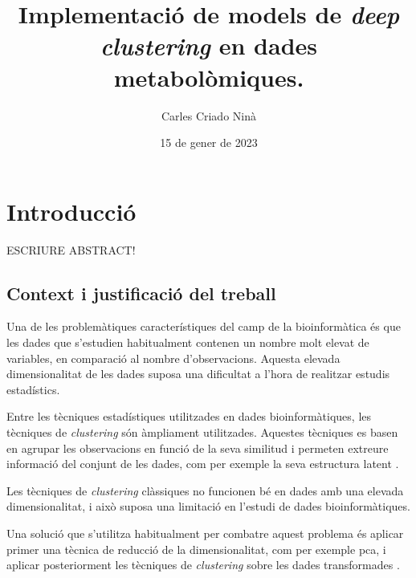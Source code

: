 \documentclass[CAT,BIB]{TFUOC}%
\title{Implementació de models de \textit{deep clustering} en dades metabolòmiques.}
\author{Carles Criado Ninà}
\date{15 de gener de 2023}
\newcommand{\todo}[1]{
            \begin{tcolorbox}[title=ToDo!, colback=red!5!white, colframe=red!50!black, coltext=red!50!black]
            #1
            \end{tcolorbox}}
\begin{document}
\estructura

\tableofcontents

\listoffigures

\listoftables




\chapter{Introducció}
\label{s:intro}

\todo{ESCRIURE ABSTRACT!}

    \section{Context i justificació del treball}
    \label{s:contect}

        Una de les problemàtiques característiques
        del camp de la bioinformàtica
        és que les dades que s'estudien
        habitualment contenen un nombre molt elevat de variables,
        en comparació al nombre d'observacions.
        Aquesta elevada dimensionalitat de les dades
        suposa una dificultat a l'hora de realitzar estudis estadístics.

        Entre les tècniques estadístiques
        utilitzades en dades bioinformàtiques,
        les tècniques de \textit{clustering}
        són àmpliament utilitzades.
        Aquestes tècniques es basen en agrupar les observacions
        en funció de la seva similitud
        i permeten extreure informació del conjunt de les dades,
        com per exemple la seva estructura latent \citep{Karim2021, Masood2015}.

        Les tècniques de \textit{clustering} clàssiques
        no funcionen bé en dades amb una elevada dimensionalitat,
        i això suposa una limitació en l'estudi de dades bioinformàtiques.

        Una solució que s'utilitza habitualment
        per combatre aquest problema
        és aplicar primer una tècnica de reducció de la dimensionalitat,
        com per exemple \gls{pca},
        i aplicar posteriorment les tècniques de \textit{clustering}
        sobre les dades transformades \citep{Min2018, Masood2015}.
\end{document}
